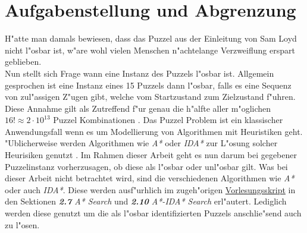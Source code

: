 \section{Aufgabenstellung und Abgrenzung} %
\label{cha:Aufgabenstellung}
H"atte man damals bewiesen, dass das Puzzel aus der Einleitung von Sam Loyd nicht l"osbar ist, w"are wohl vielen Menschen n"achtelange Verzweiflung erspart geblieben.\\
Nun stellt sich Frage wann eine Instanz des Puzzels l"osbar ist. Allgemein gesprochen ist eine Instanz eines 15 Puzzels dann l"osbar, falls es eine Sequenz von zul"assigen Z"ugen gibt, welche vom Startzustand zum Zielzustand f"uhren.\\
Diese Annahme gilt als Zutreffend f"ur genau die h"alfte aller m"oglichen $16! \approx 2 \cdot 10^{13}$ Puzzel Kombinationen \autocite{sliding-piece-puzzels:book,solving-15-puzzle-lvi:article}.
Das Puzzel Problem ist ein klassischer Anwendungsfall wenn es um Modellierung von Algorithmen mit Heuristiken geht. "Ublicherweise werden Algorithmen wie \textit{A*} oder \textit{IDA*} zur L"osung solcher Heurisiken genutzt \autocite{wiki-15-puzzle:online,solving-15-puzzle-lvi:article, depth-first-id:article}.
Im Rahmen dieser Arbeit geht es nun darum bei gegebener Puzzelinstanz vorherzusagen, ob diese als l"osbar oder unl"osbar gilt.
Was bei dieser Arbeit nicht betrachtet wird, sind die verschiedenen Algorithmen wie \textit{A*} oder auch \textit{IDA*}. Diese werden ausf"urhlich im zugeh"origen \textcolor{violet}{\href{https://github.com/karlstroetmann/Artificial-Intelligence/blob/master/Lecture-Notes/artificial-intelligence.pdf}{Vorlesungsskript}} \autocite{github-stroetmann:online} in den Sektionen \textit{\textbf{2.7} A* Search} und \textit{\textbf{2.10} A*-IDA* Search} erl"autert.
Lediglich werden diese genutzt um die als l"osbar identifizierten Puzzels anschlie"send auch zu l"osen.



